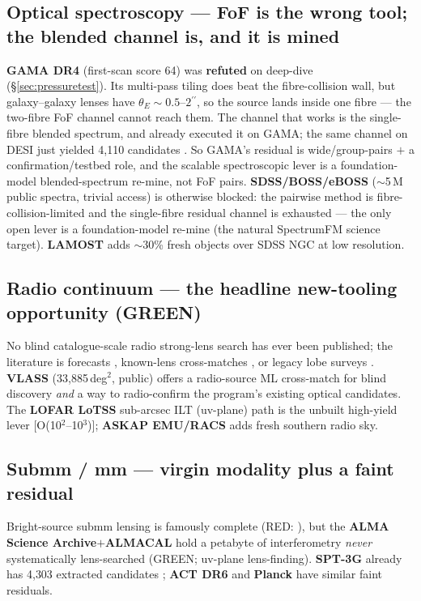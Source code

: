 \documentclass[11pt,letterpaper]{article}
\providecommand{\arcsec}{\ensuremath{^{\prime\prime}}}
\newcommand{\survey}[1]{\textbf{#1}}
\begin{document}
\subsection{Optical spectroscopy --- FoF is the wrong tool; the blended channel is, and it is mined}
\survey{GAMA DR4} (first-scan score 64) was \textbf{refuted} on deep-dive
(\S\ref{sec:pressuretest}). Its multi-pass tiling does beat the fibre-collision wall, but
galaxy--galaxy lenses have $\theta_E\sim0.5$--$2\arcsec$, so the source lands inside one fibre ---
the two-fibre FoF channel cannot reach them. The channel that works is the single-fibre blended
spectrum, and \citet{holwerda2015} already executed it on GAMA; the same channel on DESI just
yielded 4{,}110 candidates \citep{desisinglefiber2025}. So GAMA's residual is wide/group-pairs $+$ a
confirmation/testbed role, and the scalable spectroscopic lever is a foundation-model
blended-spectrum re-mine, not FoF pairs.
\survey{SDSS/BOSS/eBOSS} ($\sim$5\,M public spectra, trivial access) is otherwise blocked: the
pairwise method is fibre-collision-limited and the single-fibre residual channel is exhausted
\citep{bolton2006,brownstein2012,shu2017,talbot2021,desisinglefiber2025} --- the only open lever
is a foundation-model re-mine (the natural SpectrumFM science target). \survey{LAMOST} adds
$\sim$30\% fresh objects over SDSS NGC at low resolution.

\subsection{Radio continuum --- the headline new-tooling opportunity (GREEN)}
No blind catalogue-scale radio strong-lens search has ever been published; the literature is
forecasts \citep{mckean2008,mccarty2024,rezaei2022}, known-lens cross-matches
\citep{martinez2024vlass}, or legacy lobe surveys \citep{browne2003class,phillips2001}.
\survey{VLASS} (33{,}885\,deg$^2$, public) offers a radio-source ML cross-match for blind
discovery \emph{and} a way to radio-confirm the program's existing optical candidates. The
\survey{LOFAR LoTSS} sub-arcsec ILT (uv-plane) path is the unbuilt high-yield lever
[O(10$^2$--10$^3$)]; \survey{ASKAP EMU/RACS} adds fresh southern radio sky.

\subsection{Submm / mm --- virgin modality plus a faint residual}
Bright-source submm lensing is famously complete (RED:
\citealt{negrello2010,negrello2017,nayyeri2016,wardlow2013,vieira2013,everett2020,reuter2020,canameras2015}),
but the \survey{ALMA Science Archive}$+$\survey{ALMACAL} \citep{oteo2016almacal} hold a petabyte
of interferometry \emph{never} systematically lens-searched (GREEN; uv-plane lens-finding).
\survey{SPT-3G} already has 4{,}303 extracted candidates \citep{archipley2024}; \survey{ACT DR6}
\citep{gralla2020} and \survey{Planck} \citep{trombetti2021} have similar faint residuals.
\end{document}
